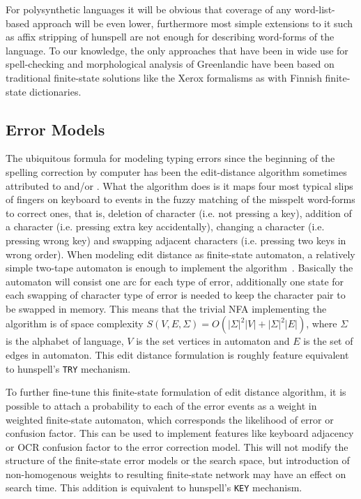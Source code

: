 \documentclass[11pt]{article}
\begin{document}
For polysynthetic languages it will be obvious that coverage of any
word-list-based approach will be even lower, furthermore most simple extensions
to it such as affix stripping of hunspell are not enough for describing
word-forms of the language. To our knowledge, the only approaches that have
been in wide use for spell-checking and morphological analysis of Greenlandic
have been based on traditional finite-state solutions like the Xerox formalisms
as with Finnish finite-state dictionaries.

\subsection{Error Models}
\label{subsec:error-models}

The ubiquitous formula for modeling typing errors since the beginning of the
spelling correction by computer has been the edit-distance algorithm sometimes
attributed to  and/or
. What the algorithm does is it maps four most
typical slips of fingers on keyboard to events in the fuzzy matching of the
misspelt word-forms to correct ones, that is, deletion of character (i.e. not
pressing a key), addition of a character (i.e. pressing extra key
accidentally), changing a character (i.e. pressing wrong key) and swapping
adjacent characters (i.e. pressing two keys in wrong order). When modeling edit
distance as finite-state automaton, a relatively simple two-tape automaton is
enough to implement the algorithm~\cite{hassan/2008}.  Basically the automaton
will consist one arc for each type of error, additionally one state for each
swapping of character type of error is needed to keep the character pair to be
swapped in memory. This means that the trivial NFA implementing the algorithm
is of space complexity $S(V, E, \Sigma) = O(|\Sigma|^2 |V| + |\Sigma|^2 |E|)$,
where $\Sigma$ is the alphabet of language, $V$ is the set vertices in
automaton and $E$ is the set of edges in automaton.  This edit distance
formulation is roughly feature equivalent to hunspell's \texttt{TRY} mechanism.

To further fine-tune this finite-state formulation of edit distance algorithm,
it is possible to attach a probability to each of the error events as a weight
in weighted finite-state automaton, which corresponds the likelihood of error
or confusion factor. This can be used to implement features like keyboard
adjacency or OCR confusion factor to the error correction model. This will not
modify the structure of the finite-state error models or the search space, but
introduction of non-homogenous weights to resulting finite-state network may
have an effect on search time. This addition is equivalent to hunspell's
\texttt{KEY} mechanism.
\end{document}
